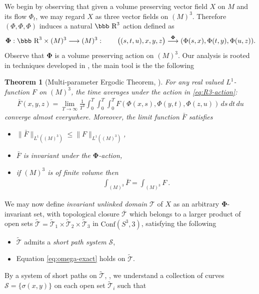 \documentclass[12pt]{article}
\newtheorem{theorem}{Theorem}[section]
\newcommand{\R}{\mbox{\bbb R}}       %
\newcommand{\Cnf}{\text{Conf}}
\newcommand{\no}{\noindent}
\begin{document}
We begin by observing that given a volume preserving vector field $X$ on $M$ and its flow $\Phi_t$, 
we may regard $X$ as three vector fields on $(M)^3$. Therefore $(\Phi,\Phi,\Phi)$ induces a natural $\R^3$ action defined as
\begin{equation}\label{eq:R3-action}
 \mathbf{\Phi}:\R^3\times (M)^3\longrightarrow (M)^3:\qquad \bigl((s,t,u),x,y,z\bigr)\stackrel{\mathbf{\Phi}}{\longrightarrow} (\Phi(s,x),\Phi(t,y), \Phi(u,z)).
\end{equation}
Observe that $\mathbf{\Phi}$ is a volume preserving action on $(M)^3$.  Our analysis is rooted in techniques developed in \cite{Arnold86, Laurence-Avellaneda93, Laurence-Stredulinsky00b}, the main tool is the the following

\begin{theorem}[Multi-parameter Ergodic Theorem, \cite{Becker81}]\label{th:multi-ergodic}
 For any real valued $L^1$-function $F$ on $(M)^3$, the time
averages under the action in \eqref{eq:R3-action}:
\begin{gather*}
\bar{F}(x,y,z)=\lim_{T\to \infty}\frac{1}{T^3}\int^T_0\int^T_0\int^T_0
 F(\Phi(x,s),\Phi(y,t),\Phi(z,u))\,d s\,d t\,d u
\end{gather*}
converge almost everywhere. Moreover, the limit function
$\bar{F}$ satisfies
\begin{itemize}
 \item[(i)] $\|\bar{F}\|_{L^1((M)^3)}\leq \|F\|_{L^1((M)^3)}$,
 \item[(ii)] $\bar{F}$ is invariant under the $\mathbf{\Phi}$-action,
 \item[(iii)] if $(M)^3$ is of finite volume then
\begin{gather}\label{eq:ergodic-integrals-equal}
 \int_{(M)^3}\bar{F} =\int_{(M)^3} F\ .
\end{gather}
\end{itemize}
\end{theorem}

\no We may now define \emph{invariant unlinked domain} $\mathcal{T}$ of $X$ as an arbitrary $\mathbf{\Phi}$-invariant set, with topological closure $\overline{\mathcal{T}}$ which belongs to a larger product of open sets $\widetilde{\mathcal{T}}=\widetilde{\mathcal{T}}_1\times \widetilde{\mathcal{T}}_2\times \widetilde{\mathcal{T}}_3$
in $\Cnf(S^3,3)$, satisfying the following 
\begin{itemize}
\item[(A)] $\widetilde{\mathcal{T}}$ admits a \emph{short path system} $\mathcal{S}$,
\item[(B)] Equation \eqref{eq:omega-exact} holds on $\widetilde{\mathcal{T}}$.
\end{itemize}
\no By a system of short paths on $\widetilde{\mathcal{T}}$, \cite{Vogel03, Khesin98}, we understand 
a collection of  curves $\mathcal{S}=\{\sigma(x,y)\}$ on each open set $\widetilde{\mathcal{T}}_i$ such that 
 
\end{document}
